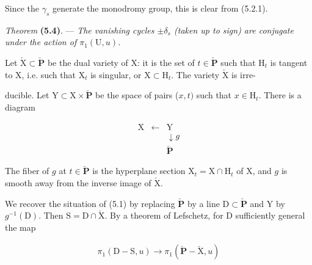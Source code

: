 \documentclass[10pt,leqno]{article}
\begin{document}
\noindent Since the \(\gamma _{s}\) generate the monodromy group, this is clear from (5.2.1).\par

\noindent \emph{Theorem} \textbf{(5.4)}. — {\itshape The vanishing cycles \(\pm \delta _{s}\) (taken up to sign) are conjugate under the action of \(\pi _{1}(\mathrm{U},u)\).}\par

\noindent Let \(\check{\mathrm{X}}\subset \check{\mathbf{P}}\) be the dual variety of \(\mathrm{X}\): it is the set of \(t\in \check{\mathbf{P}}\) such that \(\mathrm{H}_{t}\) is tangent to \(\mathrm{X}\), i.e. such that \(\mathrm{X}_{t}\) is singular, or \(\mathrm{X}\subset \mathrm{H}_{t}\). The variety \(\check{\mathrm{X}}\) is irre-\par

\clearpage

\label{physical-20}\par\smallskip

\noindent ducible. Let \(\mathrm{Y}\subset \mathrm{X}\times \check{\mathbf{P}}\) be the space of pairs (\(x,t)\) such that \(x\in \mathrm{H}_{t}\). There is a diagram\par

\[\begin{array}{ccc}\mathrm X&\xleftarrow{}&\mathrm Y\\ &&\downarrow\!{g}\\ &&\check{\mathbf P}\end{array}\]

\noindent The fiber of \(g\) at \(t\in \check{\mathbf{P}}\) is the hyperplane section \(\mathrm{X}_{t}=\mathrm{X}\cap \mathrm{H}_{t}\) of \(\mathrm{X}\), and \(g\) is smooth away from the inverse image of \(\check{\mathrm{X}}\).\par

\noindent We recover the situation of (5.1) by replacing \(\check{\mathbf{P}}\) by a line \(\mathrm{D}\subset \check{\mathbf{P}}\) and \(\mathrm{Y}\) by \(g^{- 1}(\mathrm{D})\). Then \(\mathrm{S}=\mathrm{D}\cap \check{\mathrm{X}}\). By a theorem of Lefschetz, for \(\mathrm{D}\) sufficiently general the map\par

\begin{equation*}\begin{gathered}\pi _{1}(\mathrm{D}- \mathrm{S},u) \longrightarrow  \pi _{1}(\check{\mathbf{P}}- \check{\mathrm{X}},u)\end{gathered}\end{equation*}
\end{document}
